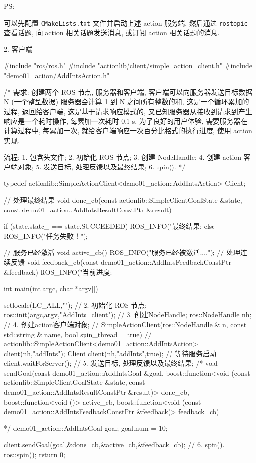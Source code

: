 \documentclass[openany, fontset=windowsold]{ctexbook}
\theoremstyle{kaiti}
\theoremstyle{normal}
\begin{document}
PS:

可以先配置 \verb|CMakeLists.txt| 文件并启动上述 action 服务端, 然后通过 \verb|rostopic| 查看话题, 向 action 相关话题发送消息, 或订阅 action 相关话题的消息.

2. 客户端

\begin{cpp}
  #include "ros/ros.h"
  #include "actionlib/client/simple_action_client.h"
  #include "demo01_action/AddIntsAction.h"

  /*  
      需求:
          创建两个 ROS 节点, 服务器和客户端, 
          客户端可以向服务器发送目标数据 N (一个整型数据)
          服务器会计算 1 到 N 之间所有整数的和, 这是一个循环累加的过程, 返回给客户端, 
          这是基于请求响应模式的, 
          又已知服务器从接收到请求到产生响应是一个耗时操作, 每累加一次耗时 0.1 s, 
          为了良好的用户体验, 需要服务器在计算过程中, 
          每累加一次, 就给客户端响应一次百分比格式的执行进度, 使用 action 实现.

      流程:
          1. 包含头文件;
          2. 初始化 ROS 节点;
          3. 创建 NodeHandle;
          4. 创建 action 客户端对象;
          5. 发送目标, 处理反馈以及最终结果;
          6. spin().
  */

  typedef actionlib::SimpleActionClient<demo01_action::AddIntsAction> Client;

  // 处理最终结果
  void done_cb(const actionlib::SimpleClientGoalState &state, const demo01_action::AddIntsResultConstPtr &result){
      if (state.state_ == state.SUCCEEDED)
      {
          ROS_INFO("最终结果:%
      } else {
          ROS_INFO("任务失败！");
      }

  }
  // 服务已经激活
  void active_cb(){
      ROS_INFO("服务已经被激活....");
  }
  // 处理连续反馈
  void  feedback_cb(const demo01_action::AddIntsFeedbackConstPtr &feedback){
      ROS_INFO("当前进度:%
  }

  int main(int argc, char *argv[])
  {
      setlocale(LC_ALL,"");
      // 2. 初始化 ROS 节点;
      ros::init(argc,argv,"AddInts_client");
      // 3. 创建NodeHandle;
      ros::NodeHandle nh;
      // 4. 创建action客户端对象;
      // SimpleActionClient(ros::NodeHandle & n, const std::string & name, bool spin_thread = true)
      // actionlib::SimpleActionClient<demo01_action::AddIntsAction> client(nh,"addInts");
      Client client(nh,"addInts",true);
      // 等待服务启动
      client.waitForServer();
      // 5. 发送目标, 处理反馈以及最终结果;
      /*  
          void sendGoal(const demo01_action::AddIntsGoal &goal, 
              boost::function<void (const actionlib::SimpleClientGoalState &state, const demo01_action::AddIntsResultConstPtr &result)> done_cb, 
              boost::function<void ()> active_cb, 
              boost::function<void (const demo01_action::AddIntsFeedbackConstPtr &feedback)> feedback_cb)

      */
      demo01_action::AddIntsGoal goal;
      goal.num = 10;

      client.sendGoal(goal,&done_cb,&active_cb,&feedback_cb);
      // 6. spin().
      ros::spin();
      return 0;
  }
\end{cpp}
\end{document}
